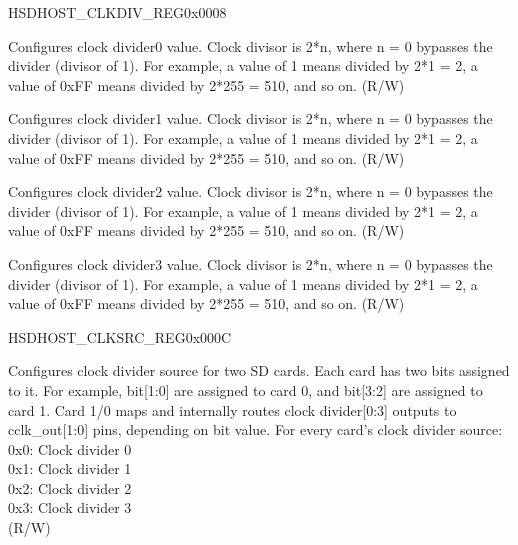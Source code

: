 \begin{register}{H}{SDHOST\_CLKDIV\_REG}{0x0008}\label{regdesc:SDHOSTCLKDIVREG}
%
%
%
%
\regnewline%
\begin{regdesc}\begin{reglist}
\label{fielddesc:SDHOSTCLKDIVIDER0}\item [SDHOST\_CLK\_DIVIDER0] Configures clock divider0 value. Clock divisor is 2*n, where n = 0 bypasses the divider (divisor of 1). For example, a value of 1 means divided by 2*1 = 2, a value of 0xFF means divided by 2*255 = 510, and so on. (R/W)
\label{fielddesc:SDHOSTCLKDIVIDER1}\item [SDHOST\_CLK\_DIVIDER1] Configures clock divider1 value. Clock divisor is 2*n, where n = 0 bypasses the divider (divisor of 1). For example, a value of 1 means divided by 2*1 = 2, a value of 0xFF means divided by 2*255 = 510, and so on. (R/W)
\label{fielddesc:SDHOSTCLKDIVIDER2}\item [SDHOST\_CLK\_DIVIDER2] Configures clock divider2 value. Clock divisor is 2*n, where n = 0 bypasses the divider (divisor of 1). For example, a value of 1 means divided by 2*1 = 2, a value of 0xFF means divided by 2*255 = 510, and so on. (R/W)
\label{fielddesc:SDHOSTCLKDIVIDER3}\item [SDHOST\_CLK\_DIVIDER3] Configures clock divider3 value. Clock divisor is 2*n, where n = 0 bypasses the divider (divisor of 1). For example, a value of 1 means divided by 2*1 = 2, a value of 0xFF means divided by 2*255 = 510, and so on. (R/W)
\end{reglist}\end{regdesc}
\end{register}


\begin{register}{H}{SDHOST\_CLKSRC\_REG}{0x000C}\label{regdesc:SDHOSTCLKSRCREG}
%
%
\regnewline%
\begin{regdesc}\begin{reglist}
\label{fielddesc:SDHOSTCLKSRCREG}\item [SDHOST\_CLKSRC\_REG] Configures clock divider source for two SD cards. Each card has two bits assigned to it. For example, bit[1:0] are assigned to card 0, and bit[3:2] are assigned to card 1. Card 1/0 maps and internally routes clock divider[0:3] outputs to cclk\_out[1:0] pins, depending on bit value. For every card's clock divider source: \\
0x0: Clock divider 0\\
0x1: Clock divider 1\\
0x2: Clock divider 2\\
0x3: Clock divider 3\\ (R/W)
\end{reglist}\end{regdesc}
\end{register}


